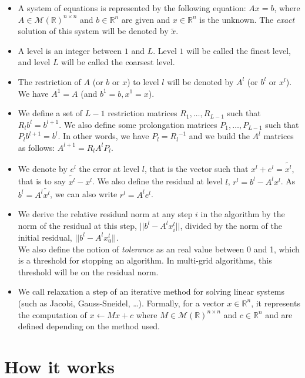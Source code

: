 \documentclass[a4paper,10pt]{article}
\begin{document}
\begin{itemize}
 \item A system of equations is represented by the following equation: $Ax=b$, where $A \in \mathcal{M}(\mathbb{R})^{n\times n}$ and $b \in \mathcal{\mathbb{R}}^n$ are given and
 $x \in \mathbb{R}^n$ is the unknown. The \emph{exact} solution of this system will be denoted by $\widetilde{x}$.
 \item A level is an integer between $1$ and $L$. Level $1$ will be called the finest level, and level $L$ will be called the coarsest level.
 \item The restriction of $A$ (or $b$ or $x$) to level $l$ will be denoted by $A^l$ (or $b^l$ or $x^l$). We have $A^1 = A$ (and $b^1=b,x^1=x$).
 \item We define a set of $L-1$ restriction matrices $R_1,\dots,R_{L-1}$ such that $R_l b^l = b^{l+1}$. We also define some prolongation matrices $P_1,\dots,P_{L-1}$ such that $P_{l}b^{l+1} = b^l$.
 In other words, we have $P_l = {R_l}^{-1}$ and we build the $A^l$ matrices as follows: $A^{l+1} = R_l A^l P_l$.
 \item We denote by $e^l$ the error at level $l$, that is the vector such that $x^l + e^l = \widetilde{x^l}$, that is to say $\widetilde{x^l}-x^l$.
 We also define the residual at level $l$, $r^l = b^l - A^lx^l$. As $b^l = A^l\widetilde{x^l}$, we can also write $r^l = A^le^l$.
 \item We derive the relative residual norm at any step $i$ in the algorithm
 by the norm of the residual at this step, $||b^l - A^lx^l_i||$, divided by the norm of the initial residual, $|| b^l - A^lx^l_0||$.\\ We also define the notion of \emph{tolerance}
 as an real value between 0 and 1, which is a threshold for stopping an algorithm. In multi-grid algorithms, this threshold will be on the residual norm.
 \item We call relaxation a step of an iterative method for solving linear systems (such as Jacobi, Gauss-Sneidel, \dots). Formally, for a vector $x \in \mathbb{R}^n$, it represents the computation of
 $x \leftarrow Mx + c$ where $M \in \mathcal{M}(\mathbb{R})^{n\times n}$ and $c \in \mathcal{\mathbb{R}}^n$ and are defined depending on the method used.
\end{itemize}

\section{How it works}
\end{document}
